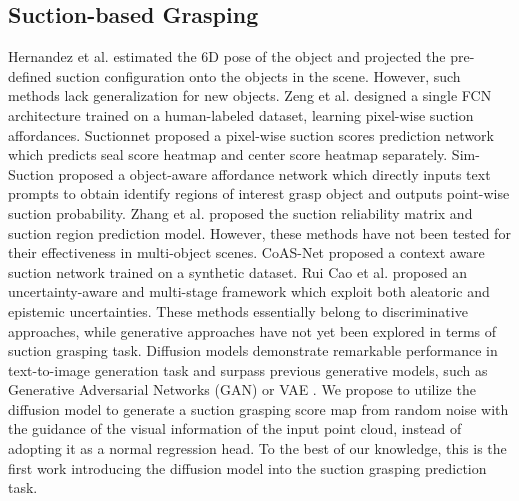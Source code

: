 \subsection{Suction-based Grasping} 
Hernandez et al. \cite{hernandez2017team} estimated the 6D pose of the object \cite{pvn3d,p1,p2,parametricnet,SD-Net} and projected the pre-defined suction configuration onto the objects in the scene. However, such methods lack generalization for new objects. Zeng et al. \cite{zeng2022robotic} designed a single FCN architecture trained on a human-labeled dataset, learning pixel-wise suction affordances. Suctionnet \cite{Suctionnet} proposed a pixel-wise suction scores prediction network which predicts seal score heatmap and center score heatmap separately. Sim-Suction \cite{Sim-Suction} proposed a object-aware affordance network which directly inputs text prompts to obtain identify regions of interest grasp object and outputs point-wise suction probability. Zhang et al. \cite{zhang2023robot} proposed the suction reliability matrix and suction region prediction model. However, these methods have not been tested for their effectiveness in multi-object scenes. CoAS-Net \cite{CoAS-Net} proposed a context aware suction network trained on a synthetic dataset. Rui Cao et al. \cite{uncertainty} proposed an uncertainty-aware and multi-stage framework which exploit both aleatoric and epistemic uncertainties. These methods essentially belong to discriminative approaches, while generative approaches have not yet been explored in terms of suction grasping task. Diffusion models \cite{ho2020denoising} demonstrate remarkable performance in text-to-image generation task and surpass previous generative models, such as Generative Adversarial Networks (GAN) \cite{gan} or VAE \cite{vae}. We propose to utilize the diffusion model to generate a suction grasping score map from random noise with the guidance of the visual information of the input point cloud, instead of adopting it as a normal regression head. To the best of our knowledge, this is the first work introducing the diffusion model into the suction grasping prediction task.

